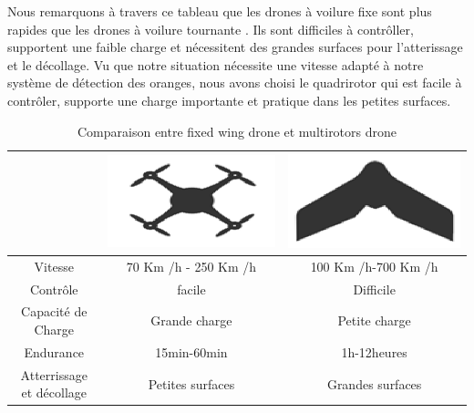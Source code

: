 \documentclass[a4paper,12pt]{report}
\begin{document}
	Nous remarquons à travers ce tableau que les drones à voilure fixe sont plus rapides que les drones à voilure tournante  . Ils sont difficiles à contrôller, supportent une faible charge et nécessitent des grandes surfaces pour l'atterissage et le décollage.
    Vu que notre situation nécessite une vitesse adapté à notre système de détection des oranges, nous avons choisi le quadrirotor qui est facile à contrôler, supporte une charge importante et pratique dans les petites surfaces.      
	\begin{table}[h]
		\begin{center}
			\caption{Comparaison entre fixed wing drone et multirotors drone	 }
			\begin{tabular}{|c|c|c|}
				\hline
				\centering
				& 
				\includegraphics[scale=0.2]{../Images/Quadrirotor}
				&
				\includegraphics[scale=0.2]{../Images/Ailed fixed}\\
				
				\hline
				Vitesse & 70 Km /h - 250 Km /h & 100 Km /h-700 Km /h  \\
				\hline
				Contrôle	& facile &	Difficile \\
				\hline
				Capacité de Charge &	Grande charge &	Petite charge \\
				\hline
				Endurance &	15min-60min & 1h-12heures \\
				\hline
				Atterrissage et décollage &	Petites surfaces &	Grandes surfaces \\
				\hline
			\end{tabular}
		\end{center}
	\end{table}
\newpage
	
\end{document}
